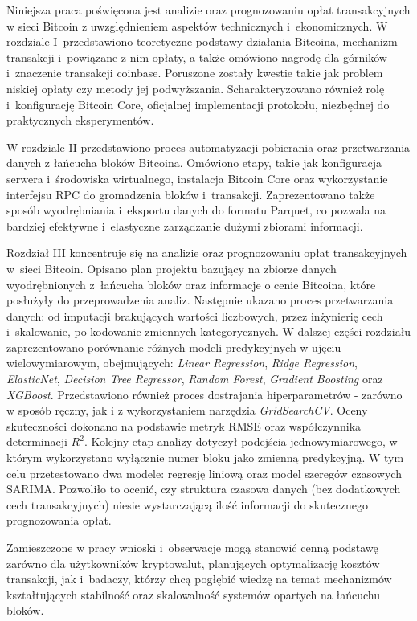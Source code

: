 \documentclass[12pt,a4paper]{report}
\theoremstyle{definition} %
\begin{document}
	Niniejsza praca poświęcona jest analizie oraz prognozowaniu opłat transakcyjnych w sieci Bitcoin z uwzględnieniem aspektów technicznych i~ekonomicznych. W rozdziale I~przedstawiono teoretyczne podstawy działania Bitcoina, mechanizm transakcji i~powiązane z nim opłaty, a także omówiono nagrodę dla górników i~znaczenie transakcji coinbase. 			Poruszone zostały kwestie takie jak problem niskiej opłaty czy metody jej podwyższania. Scharakteryzowano również rolę i~konfigurację Bitcoin Core, oficjalnej implementacji protokołu, niezbędnej do praktycznych eksperymentów.

	W rozdziale II przedstawiono proces automatyzacji pobierania oraz przetwarzania danych z łańcucha bloków Bitcoina. Omówiono etapy, takie jak konfiguracja serwera i~środowiska wirtualnego, instalacja Bitcoin Core oraz wykorzystanie interfejsu RPC do gromadzenia bloków i~transakcji. Zaprezentowano także sposób wyodrębniania i~eksportu 		danych do formatu Parquet, co pozwala na bardziej efektywne i~elastyczne zarządzanie dużymi zbiorami informacji.

	Rozdział III koncentruje się na analizie oraz prognozowaniu opłat transakcyjnych w~sieci Bitcoin. Opisano plan projektu bazujący na zbiorze danych wyodrębnionych z~łańcucha bloków oraz informacje o cenie Bitcoina, które posłużyły do przeprowadzenia analiz. Następnie ukazano proces przetwarzania danych: od imputacji brakujących wartości liczbowych, przez inżynierię cech i~skalowanie, po kodowanie zmiennych kategorycznych. W dalszej części rozdziału zaprezentowano porównanie różnych modeli predykcyjnych w ujęciu wielowymiarowym, obejmujących: \textit{Linear Regression}, \textit{Ridge Regression}, \textit{ElasticNet}, \textit{Decision Tree Regressor}, \textit{Random Forest}, \textit{Gradient Boosting} oraz \textit{XGBoost}. Przedstawiono również proces dostrajania hiperparametrów - zarówno w sposób ręczny, jak i z wykorzystaniem narzędzia \textit{GridSearchCV}. Oceny skuteczności dokonano na podstawie metryk RMSE oraz współczynnika determinacji $R^2$. Kolejny etap analizy dotyczył podejścia jednowymiarowego, w którym wykorzystano wyłącznie numer bloku jako zmienną predykcyjną. W tym celu przetestowano dwa modele: regresję liniową oraz model szeregów czasowych SARIMA. Pozwoliło to ocenić, czy struktura czasowa danych (bez dodatkowych cech transakcyjnych) niesie wystarczającą ilość informacji do skutecznego prognozowania opłat.

Zamieszczone w pracy wnioski i~obserwacje mogą stanowić cenną podstawę zarówno dla użytkowników kryptowalut, planujących optymalizację kosztów transakcji, jak i~badaczy, którzy chcą pogłębić wiedzę na temat mechanizmów kształtujących stabilność oraz skalowalność systemów opartych na łańcuchu bloków.
	
\end{document}
